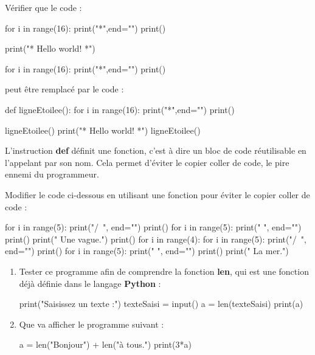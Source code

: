 \documentclass[a4paper,11pt,DIV18,BCOR0mm]{scrartcl}
\begin{document}
\begin{exercice}
Vérifier que le code :
\begin{python}
for i in range(16):
    print("*",end="")
print()

print("* Hello world! *")

for i in range(16):
    print("*",end="")
print()
\end{python}
peut être remplacé par le code :
\begin{python}
def ligneEtoilee():
    for i in range(16):
        print("*",end="")
    print()
    
ligneEtoilee()
print("* Hello world! *")
ligneEtoilee()
\end{python}
L'instruction \textbf{def} définit une fonction, c'est à dire
 un bloc de code réutilisable en l'appelant par son nom. 
 Cela permet d'éviter le copier
coller de code, le pire ennemi du programmeur.
\end{exercice}


\begin{exercice}
Modifier le code ci-dessous en utilisant une fonction pour
éviter le copier coller de code :
\begin{python}
for i in range(5):
    print("/\  ", end="")
print()
for i in range(5):
    print("  \/", end="")
print()
print("     Une vague.")
print()
for i in range(4):
    for i in range(5):
        print("/\  ", end="")
    print()
    for i in range(5):
        print("  \/", end="")
    print()
print("       La mer.")
\end{python}
\end{exercice}

\begin{exercice}
\begin{enumerate}
\item Tester ce programme afin de comprendre la fonction \textbf{len}, qui est une 
fonction déjà définie dans le langage \textbf{Python} :
\begin{python}
print("Saisissez un texte :")
texteSaisi = input()
a = len(texteSaisi)
print(a)
\end{python}
\item Que va afficher le programme suivant :
\begin{python}
a = len("Bonjour") + len("à tous.")
print(3*a)
\end{python}
\end{enumerate}
\end{exercice}
\end{document}
